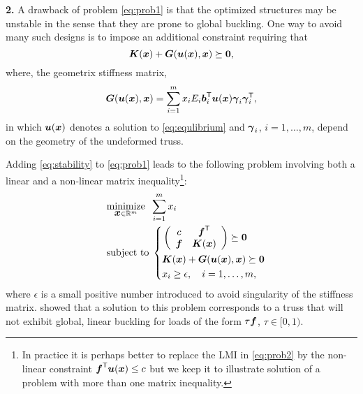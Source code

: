 \documentclass{article}
\newcommand{\bm}[1]{\mbox{\boldmath $#1$}}
\newcommand{\T}{\textsf{T}}
\begin{document}
\vskip2mm
\noindent\textbf{2.} 
A drawback of problem \eqref{eq:prob1} is that the optimized structures may be unstable in the sense that they are prone to global buckling. One way to avoid many such designs is to impose an additional constraint \cite{Kocvara:2002} requiring that
\begin{equation}\label{eq:stability}
\bm{K}(\bm{x}) + \bm{G}(\bm{u}(\bm{x}),\bm{x}) \succeq \bm{0},
\end{equation}
where, the geometrix stiffness matrix, 
\begin{equation}\nonumber
\bm{G}(\bm{u}(\bm{x}),\bm{x}) = \sum_{i=1}^{m}x_{i}E_{i}\bm{b}_{i}^{\T}\bm{u}(\bm{x})\bm{\gamma}_{i}\bm{\gamma}_{i}^{\T},
\end{equation}
in which $\bm{u}(\bm{x})$ denotes a solution to \eqref{eq:equlibrium} and $\bm{\gamma}_{i}$, $i=1,\ldots,m$, depend on the geometry of the 
undeformed truss. 

Adding \eqref{eq:stability} to \eqref{eq:prob1} leads to the following problem involving both a linear and a non-linear matrix 
inequality\footnote{In practice it is perhaps better to replace the LMI in \eqref{eq:prob2} by the non-linear constraint $\bm{f}^{\T}\bm{u}(\bm{x})\leq c$ but we keep it to illustrate solution of a problem with more than one matrix inequality.}:
\begin{equation}\label{eq:prob2}
\quad
	\begin{aligned}
	&	\underset{\bm{x}\in\mathbb{R}^{m}}{\mbox{minimize}} \;\; \sum_{i=1}^{m}x_{i} \\
	&	\mbox{subject to} \;
	\left\{
		\begin{aligned}
		  & \left(
\begin{array}{cc}
c &\bm{f}^{\T}         \\
\bm{f} & \bm{K}(\bm{x})
\end{array}
\right) \succeq \bm{0} \\
			& \bm{K}(\bm{x}) + \bm{G}(\bm{u}(\bm{x}),\bm{x}) \succeq \bm{0} \\
			& x_{i} \geq \epsilon , \quad i=1,\ldots,m,
		\end{aligned}
		\right.
	\end{aligned}
\end{equation}
where $\epsilon$ is a small positive number introduced to avoid singularity of the stiffness matrix. \citet{Kocvara:2002} showed that a solution to this problem corresponds to a truss that will not exhibit global, linear buckling for loads
of the form $\tau\bm{f}$, $\tau\in[0,1)$.
\end{document}
